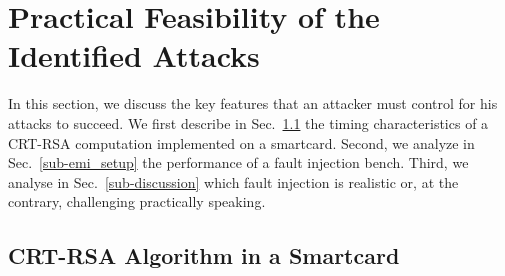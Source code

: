 \documentclass[10pt]{article}
\theoremstyle{definition}
\theoremstyle{theorem}
\begin{document}



\appendix
\section{Practical Feasibility of the Identified Attacks}
\label{app-practice}

In this section, we discuss the key features that an attacker must control for his attacks to succeed.
We first describe in Sec.~\ref{sub-crt-rsa-implem} the timing characteristics of a CRT-RSA computation implemented on a smartcard.
Second, we analyze in Sec.~\ref{sub-emi_setup} the performance of a fault injection bench.
Third, we analyse in Sec.~\ref{sub-discussion} which fault injection is realistic or, at the contrary, challenging practically speaking.

\subsection{CRT-RSA Algorithm in a Smartcard}
\label{sub-crt-rsa-implem}
\end{document}
